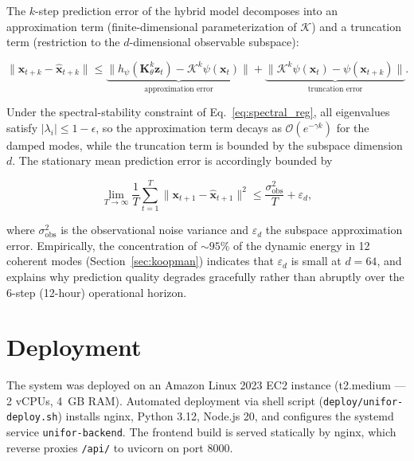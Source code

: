 \documentclass[preprint,12pt,times,numbers]{elsarticle}
\begin{document}
The $k$-step prediction error of the hybrid model decomposes into an approximation term (finite-dimensional parameterization of $\mathcal{K}$) and a truncation term (restriction to the $d$-dimensional observable subspace):

\begin{equation}
\|\mathbf{x}_{t+k} - \hat{\mathbf{x}}_{t+k}\| \leq
\underbrace{\bigl\| h_\psi(\mathbf{K}_\theta^k \mathbf{z}_t) - \mathcal{K}^k \psi(\mathbf{x}_t) \bigr\|}_{\text{approximation error}} +
\underbrace{\bigl\| \mathcal{K}^k \psi(\mathbf{x}_t) - \psi(\mathbf{x}_{t+k}) \bigr\|}_{\text{truncation error}}.
\label{eq:error_bound}
\end{equation}

Under the spectral-stability constraint of Eq.~\eqref{eq:spectral_reg}, all eigenvalues satisfy $|\lambda_i| \leq 1 - \epsilon$, so the approximation term decays as $\mathcal{O}(e^{-\gamma k})$ for the damped modes, while the truncation term is bounded by the subspace dimension $d$. The stationary mean prediction error is accordingly bounded by

\begin{equation}
\lim_{T \to \infty} \frac{1}{T} \sum_{t=1}^{T} \|\mathbf{x}_{t+1} - \hat{\mathbf{x}}_{t+1}\|^2 \leq
\frac{\sigma_{\text{obs}}^2}{T} + \varepsilon_d,
\label{eq:convergence}
\end{equation}

where $\sigma_{\text{obs}}^2$ is the observational noise variance and $\varepsilon_d$ the subspace approximation error. Empirically, the concentration of ${\sim}95\%$ of the dynamic energy in 12 coherent modes (Section~\ref{sec:koopman}) indicates that $\varepsilon_d$ is small at $d = 64$, and explains why prediction quality degrades gracefully rather than abruptly over the 6-step (12-hour) operational horizon.

\section{Deployment}
\label{sec:deploy}

The system was deployed on an Amazon Linux 2023 EC2 instance (t2.medium --- 2 vCPUs, 4~GB RAM). Automated deployment via shell script (\texttt{deploy/unifor-deploy.sh}) installs nginx, Python 3.12, Node.js 20, and configures the systemd service \texttt{unifor-backend}. The frontend build is served statically by nginx, which reverse proxies \texttt{/api/} to uvicorn on port 8000.
\end{document}
